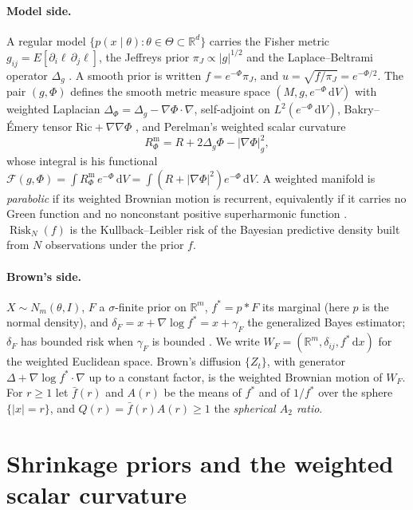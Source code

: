 \documentclass[a4paper,11pt,noarxiv]{quantumarticle}
\newcommand{\R}{\mathbb{R}}
\newcommand{\Rm}{R^{\mathrm m}}
\newcommand{\Risk}{\operatorname{Risk}}
\newcommand{\abs}[1]{\lvert #1\rvert}
\newcommand{\dd}{\,\mathrm{d}}
\newcommand{\grad}{\nabla}
\newcommand{\fbar}{\bar f}
\theoremstyle{plain}
\theoremstyle{definition}
\theoremstyle{remark}
\begin{document}
\paragraph{Model side.}
A regular model $\{p(x\mid\theta):\theta\in\Theta\subset\R^d\}$ carries
the Fisher metric $g_{ij}=E[\partial_i\ell\,\partial_j\ell]$, the
Jeffreys prior $\pi_J\propto\abs{g}^{1/2}$ and the Laplace--Beltrami
operator $\Delta_g$ \cite{amari2000}. A smooth prior is written
$f=e^{-\Phi}\pi_J$, and $u=\sqrt{f/\pi_J}=e^{-\Phi/2}$. The pair
$(g,\Phi)$ defines the smooth metric measure space
$(M,g,e^{-\Phi}\dd V)$ with weighted Laplacian
$\Delta_\Phi=\Delta_g-\grad\Phi\cdot\grad$, self-adjoint on
$L^2(e^{-\Phi}\dd V)$, Bakry--\'Emery tensor
$\mathrm{Ric}+\grad\grad\Phi$ \cite{bakryemery1985}, and Perelman's
weighted scalar curvature \cite{perelman2002}
\begin{equation}\label{eq:perelman}
\Rm_\Phi=R+2\Delta_g\Phi-\abs{\grad\Phi}_g^2,
\end{equation}
whose integral is his functional
$\mathcal F(g,\Phi)=\int\Rm_\Phi\,e^{-\Phi}\dd V
=\int(R+\abs{\grad\Phi}^2)e^{-\Phi}\dd V$.
A weighted manifold is \emph{parabolic} if its weighted Brownian motion
is recurrent, equivalently if it carries no Green function and no
nonconstant positive superharmonic function \cite[\S5]{grigoryan1999}.
$\Risk_N(f)$ is the Kullback--Leibler risk of the Bayesian predictive
density built from $N$ observations under the prior $f$.

\paragraph{Brown's side.}
$X\sim N_m(\theta,I)$, $F$ a $\sigma$-finite prior on $\R^m$,
$f^*=p*F$ its marginal (here $p$ is the normal density), and
$\delta_F=x+\grad\log f^*=x+\gamma_F$ the generalized Bayes estimator;
$\delta_F$ has bounded risk when $\gamma_F$ is bounded
\cite[\S3]{brown1971}. We write $W_F=(\R^m,\delta_{ij},f^*\dd x)$ for
the weighted Euclidean space. Brown's diffusion $\{Z_t\}$, with
generator $\Delta+\grad\log f^*\cdot\grad$ up to a constant factor, is
the weighted Brownian motion of $W_F$. For $r\ge1$ let $\fbar(r)$ and
$A(r)$ be the means of $f^*$ and of $1/f^*$ over the sphere
$\{\abs{x}=r\}$, and $Q(r)=\fbar(r)A(r)\ge1$ the \emph{spherical $A_2$
ratio}.

\section{Shrinkage priors and the weighted scalar curvature}
\label{sec:komaki}
\end{document}
